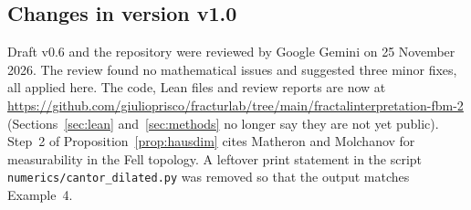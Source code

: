 \documentclass[11pt]{article}
\theoremstyle{remark}
\theoremstyle{definition}
\begin{document}
\subsection{Changes in version v1.0}\label{app:v10}
Draft v0.6 and the repository were reviewed by Google Gemini on 25 November 2026. The review found no mathematical issues and suggested three minor fixes, all applied here. The code, Lean files and review reports are now at \url{https://github.com/giulioprisco/fracturlab/tree/main/fractalinterpretation-fbm-2} (Sections~\ref{sec:lean} and~\ref{sec:methods} no longer say they are not yet public). Step~2 of Proposition~\ref{prop:hausdim} cites Matheron \cite{Mat75} and Molchanov \cite{Mol17} for measurability in the Fell topology. A leftover print statement in the script \texttt{numerics/cantor\_dilated.py} was removed so that the output matches Example~4.
\end{document}

